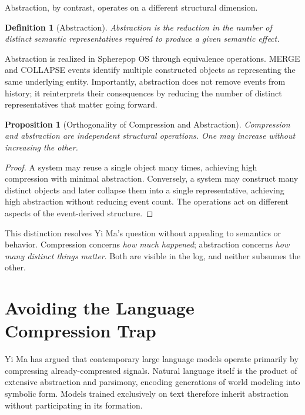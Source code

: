 \documentclass[11pt]{article}
\newtheorem{definition}{Definition}[section]
\newtheorem{proposition}{Proposition}[section]
\begin{document}
Abstraction, by contrast, operates on a different structural dimension.

\begin{definition}[Abstraction]
Abstraction is the reduction in the number of distinct semantic
representatives required to produce a given semantic effect.
\end{definition}

Abstraction is realized in Spherepop OS through equivalence operations.
MERGE and COLLAPSE events identify multiple constructed objects as
representing the same underlying entity. Importantly, abstraction does not
remove events from history; it reinterprets their consequences by reducing
the number of distinct representatives that matter going forward.

\begin{proposition}[Orthogonality of Compression and Abstraction]
Compression and abstraction are independent structural operations. One may
increase without increasing the other.
\end{proposition}

\begin{proof}
A system may reuse a single object many times, achieving high compression
with minimal abstraction. Conversely, a system may construct many distinct
objects and later collapse them into a single representative, achieving
high abstraction without reducing event count. The operations act on
different aspects of the event-derived structure.
\end{proof}

This distinction resolves Yi Ma’s question without appealing to semantics or
behavior. Compression concerns \emph{how much happened}; abstraction
concerns \emph{how many distinct things matter}. Both are visible in the
log, and neither subsumes the other.

\section{Avoiding the Language Compression Trap}

Yi Ma has argued that contemporary large language models operate primarily
by compressing already-compressed signals. Natural language itself is the
product of extensive abstraction and parsimony, encoding generations of
world modeling into symbolic form. Models trained exclusively on text
therefore inherit abstraction without participating in its formation.
\end{document}
